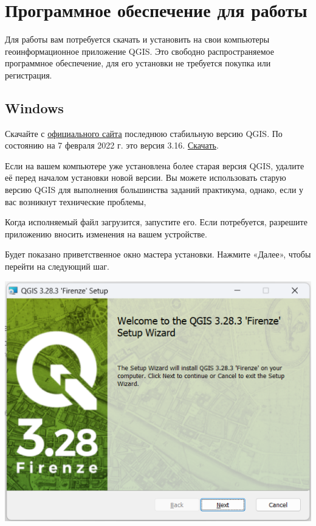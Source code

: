 \documentclass[
  12pt,
]{book}
\begin{document}
\hypertarget{ux43fux440ux43eux433ux440ux430ux43cux43cux43dux43eux435-ux43eux431ux435ux441ux43fux435ux447ux435ux43dux438ux435-ux434ux43bux44f-ux440ux430ux431ux43eux442ux44b}{%
\section*{Программное обеспечение для работы}\label{ux43fux440ux43eux433ux440ux430ux43cux43cux43dux43eux435-ux43eux431ux435ux441ux43fux435ux447ux435ux43dux438ux435-ux434ux43bux44f-ux440ux430ux431ux43eux442ux44b}}

Для работы вам потребуется скачать и установить на свои компьютеры геоинформационное приложение QGIS. Это свободно распространяемое программное обеспечение, для его установки не требуется покупка или регистрация.

\hypertarget{windows}{%
\subsection*{Windows}\label{windows}}

Скачайте с \href{https://qgis.org/ru/site/forusers/download.html}{официального сайта} последнюю стабильную версию QGIS. По состоянию на 7 февраля 2022 г. это версия 3.16. \href{https://qgis.org/downloads/QGIS-OSGeo4W-3.16.16-1.msi}{Скачать}.

Если на вашем компьютере уже установлена более старая версия QGIS, удалите её перед началом установки новой версии. Вы можете использовать старую версию QGIS для выполнения большинства заданий практикума, однако, если у вас возникнут технические проблемы,

Когда исполняемый файл загрузится, запустите его. Если потребуется, разрешите приложению вносить изменения на вашем устройстве.

Будет показано приветственное окно мастера установки. Нажмите «Далее», чтобы перейти на следующий шаг.

\includegraphics{images/installation_instruction_win/win01.png}
\end{document}
